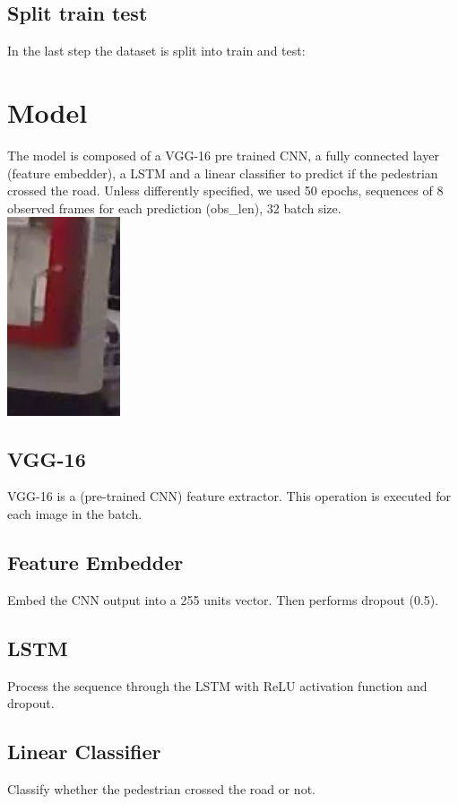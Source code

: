 \documentclass[11pt]{article}
\begin{document}
\subsection*{Split train test}
    In the last step the dataset is split into train and test:
    \\
\section{Model}
The model is composed of a VGG-16 pre trained CNN, a fully connected layer (feature embedder), a LSTM and
a linear classifier to predict if the pedestrian crossed the road.
Unless differently specified, we used 50 epochs, sequences of 8 observed frames for each prediction (obs\_len), 32 batch size.\\
\includegraphics[width=0.25\textwidth]{jaaderrorcrop}\\

\subsection*{VGG-16}
VGG-16 is a (pre-trained CNN) feature extractor.
This operation is executed for each image in the batch.
\subsection*{Feature Embedder}
Embed the CNN output into a 255 units vector.
Then performs dropout (0.5).

\subsection*{LSTM}
Process the sequence through the LSTM with ReLU activation function and dropout.


\subsection*{Linear Classifier}
Classify whether the pedestrian crossed the road or not.
\end{document}
